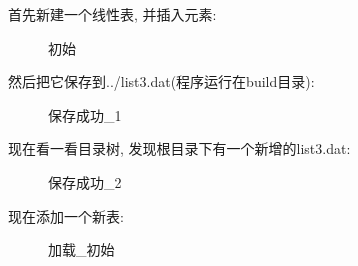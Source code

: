 \documentclass[supercite]{Experimental_Report}
\theoremstyle{definition}
\begin{document}
\noindent
首先新建一个线性表, 并插入元素:
\begin{figure}[htbp]
	\centering
	\centering
	\caption{初始}
	\label{fig3-2}
\end{figure}

\noindent
然后把它保存到../list3.dat(程序运行在build目录):
\begin{figure}[htbp]
	\centering
	\centering
	\caption{保存成功\_1}
	\label{fig3-3}
\end{figure}

\clearpage
\noindent
现在看一看目录树, 发现根目录下有一个新增的list3.dat:
\begin{figure}[htbp]
	\centering
	\centering
	\caption{保存成功\_2}
	\label{fig3-4}
\end{figure}

\noindent
现在添加一个新表:
\begin{figure}[htbp]
	\centering
	\centering
	\caption{加载\_初始}
	\label{fig3-5}
\end{figure}
\end{document}
